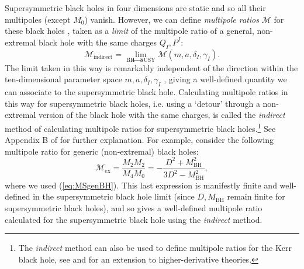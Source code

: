 \documentclass[12pt,a4paper]{article}
\newcommand{\be}{\begin{equation}}
\newcommand{\ee}{\end{equation}}
\def\indirect{\emph{indirect} }
\begin{document}
Supersymmetric black holes in four dimensions are static and so all their multipoles (except $M_0$) vanish. However, we can define \emph{multipole ratios} $\mathcal{M}$ for these black holes \cite{Bena:2020see,Bena:2020uup}, taken as a \emph{limit} of the multipole ratio of a general, non-extremal black hole with the same charges $Q_I,P^I$:
\be \mathcal{M}_{\text{indirect}} = \lim_{\text{BH}\rightarrow \text{SUSY}} \mathcal{M}(m,a,\delta_I,\gamma_I).\ee
The limit taken in this way is remarkably independent of the direction within the ten-dimensional parameter space $m,a,\delta_I,\gamma_I$ \cite{Bena:2020see,Bena:2020uup}, giving a well-defined quantity we can associate to the supersymmetric black hole. Calculating multipole ratios in this way for supersymmetric black holes, i.e. using a `detour' through a non-extremal version of the black hole with the same charges, is called the \indirect method of calculating multipole ratios for supersymmetric black holes.\footnote{The \indirect method can also be used to define multipole ratios for the Kerr black hole, see \cite{Bena:2020see,Bena:2020uup} and \cite{Cano:2022wwo} for an extension to higher-derivative theories.} See Appendix B of \cite{Bena:2020uup} for further explanation. For example, consider the following multipole ratio for generic (non-extremal) black holes:
\be \mathcal{M}_\text{ex} = \frac{M_2 M_2}{M_4 M_0} = - \frac{D^2 + M_\text{BH}^2}{3D^2 - M_\text{BH}^2},\ee
where we used (\ref{eq:MSgenBH}).
This last expression is manifestly finite and well-defined in the supersymmetric black hole limit (since $D,M_\text{BH}$ remain finite for supersymmetric black holes), and so gives a well-defined multipole ratio calculated for the supersymmetric black hole using the \indirect method.
\end{document}
